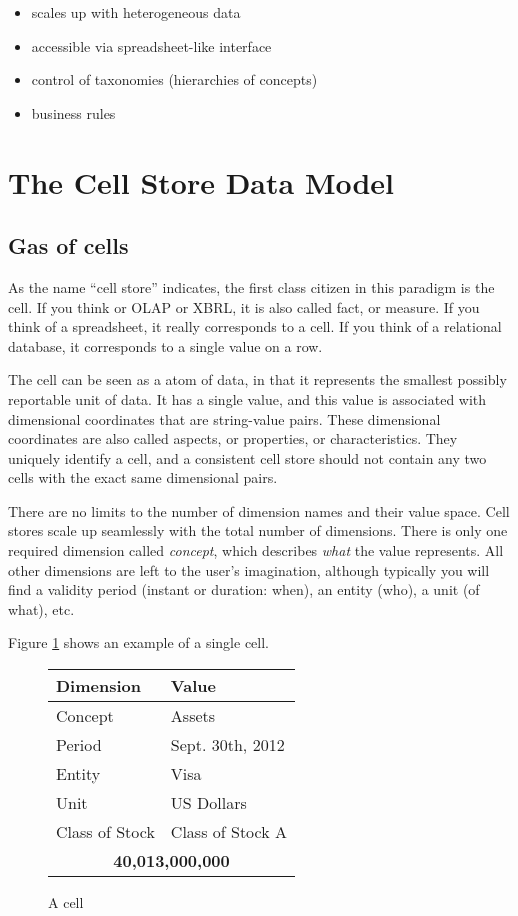 \documentclass{vldb}
\begin{document}
\begin{itemize}

\item scales up with heterogeneous data

\item accessible via spreadsheet-like interface

\item control of taxonomies (hierarchies of concepts)

\item business rules

\end{itemize}


\section{The Cell Store Data Model}

\subsection{Gas of cells}

As the name ``cell store'' indicates, the first class citizen in this paradigm is the cell. If you think or OLAP or XBRL, it is also called fact, or measure. If you think of a spreadsheet, it really corresponds to a cell. If you think of a relational database, it corresponds to a single value on a row.

The cell can be seen as a atom of data, in that it represents the smallest possibly reportable unit of data. It has a single value, and this value is associated with dimensional coordinates that are string-value pairs. These dimensional coordinates are also called aspects, or properties, or characteristics. They uniquely identify a cell, and a consistent cell store should not contain any two cells with the exact same dimensional pairs.

There are no limits to the number of dimension names and their value space. Cell stores scale up seamlessly with the total number of dimensions. There is only one required dimension called \emph{concept}, which describes \emph{what} the value represents. All other dimensions are left to the user's imagination, although typically you will find a validity period (instant or duration: when), an entity (who), a unit (of what), etc.

Figure \ref{fig-cell} shows an example of a single cell.

\begin{figure}
\caption{A cell}
\label{fig-cell}
\begin{tabular}{|l|l|}
\hline
Dimension & Value \\
\hline
Concept & Assets \\
Period & Sept. 30th, 2012 \\
Entity & Visa \\
Unit & US Dollars \\
Class of Stock & Class of Stock A \\
\hline
\multicolumn{2}{|c|}{\textbf{40,013,000,000}} \\
\hline
\end{tabular}
\end{figure}
\end{document}
